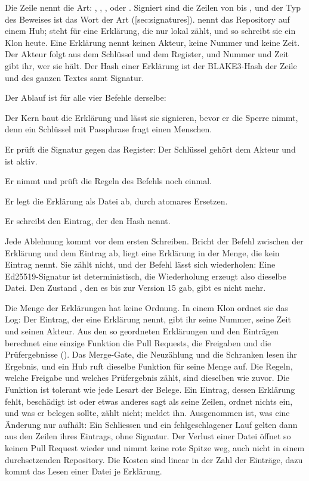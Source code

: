 Die Zeile  nennt die Art: , ,
,  oder .
Signiert sind die Zeilen von  bis , und der Typ des Beweises ist
das Wort der Art ([sec:signatures]).
 nennt das Repository auf einem Hub; \type{-} steht für eine Erklärung, die
nur lokal zählt, und so schreibt sie ein Klon heute.
Eine Erklärung nennt keinen Akteur, keine Nummer und keine Zeit.
Der Akteur folgt aus dem Schlüssel und dem Register, und Nummer und Zeit gibt ihr, wer sie hält.
Der Hash einer Erklärung ist der BLAKE3-Hash der Zeile  und des
ganzen Textes samt Signatur.

Der Ablauf ist für alle vier Befehle derselbe:

\startitemize[n]
\item Der Kern baut die Erklärung und lässt sie signieren, bevor er die Sperre nimmt, denn ein
Schlüssel mit Passphrase fragt einen Menschen.
\item Er prüft die Signatur gegen das Register: Der Schlüssel gehört dem Akteur und ist aktiv.
\item Er nimmt  und prüft die Regeln des Befehls noch einmal.
\item Er legt die Erklärung als Datei  ab, durch atomares
Ersetzen.
\item Er schreibt den Eintrag, der den Hash nennt.
\stopitemize

Jede Ablehnung kommt vor dem ersten Schreiben.
Bricht der Befehl zwischen der Erklärung und dem Eintrag ab, liegt eine Erklärung in der Menge,
die kein Eintrag nennt.
Sie zählt nicht, und der Befehl lässt sich wiederholen: Eine Ed25519-Signatur ist
deterministisch, die Wiederholung erzeugt also dieselbe Datei.
Den Zustand , den es bis zur Version 15 gab, gibt es nicht mehr.

Die Menge der Erklärungen hat keine Ordnung.
In einem Klon ordnet sie das Log: Der Eintrag, der eine Erklärung nennt, gibt ihr seine Nummer,
seine Zeit und seinen Akteur.
Aus den so geordneten Erklärungen und den Einträgen  berechnet eine einzige
Funktion die Pull Requests, die Freigaben und die Prüfergebnisse ().
Das Merge-Gate, die Neuzählung und die Schranken lesen ihr Ergebnis, und ein Hub ruft dieselbe
Funktion für seine Menge auf.
Die Regeln, welche Freigabe und welches Prüfergebnis zählt, sind dieselben wie zuvor.
Die Funktion ist tolerant wie jede Lesart der Belege.
Ein Eintrag, dessen Erklärung fehlt, beschädigt ist oder etwas anderes sagt als seine Zeilen,
ordnet nichts ein, und was er belegen sollte, zählt nicht;  meldet ihn.
Ausgenommen ist, was eine Änderung nur aufhält: Ein Schliessen und ein fehlgeschlagener Lauf
gelten dann aus den Zeilen ihres Eintrags, ohne Signatur.
Der Verlust einer Datei öffnet so keinen Pull Request wieder und nimmt keine rote Spitze weg,
auch nicht in einem durchsetzenden Repository.
Die Kosten sind linear in der Zahl der Einträge, dazu kommt das Lesen einer Datei je Erklärung.

